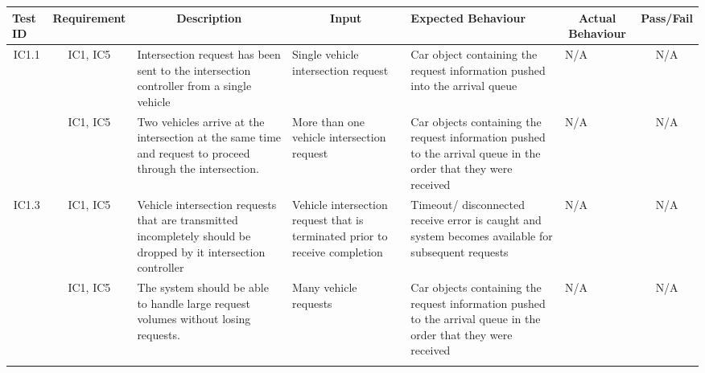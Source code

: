 \documentclass [10pt]{article}
\begin{document}
  \begin{longtable}{ | p{ } | p{ } |  p{ } |  p{ } | p{ } | p{ } |  p{ } |}  \hline

    \rowcolor{subsectionC}\textbf{Test ID}
    & \multicolumn{1}{c|}{\textbf{Requirement} }
    &\multicolumn{1}{c|}{\textbf{Description} }
    & \multicolumn{1}{c|}{\textbf{Input} }
    & \textbf{Expected Behaviour} 
    & \multicolumn{1}{c|}{\textbf{Actual Behaviour} }
    & \multicolumn{1}{c|}{\textbf{Pass/Fail}} \\  \hline
    
    \multicolumn{1}{|c|}{IC1.1} 
    & \multicolumn{1}{c|}{IC1, IC5}
    & Intersection request has been sent to the intersection controller from a single vehicle
    & Single vehicle intersection request 
    & Car object containing the request information pushed into the arrival queue
    & N/A
    & \multicolumn{1}{|c|}{N/A}\\ \hline
    \rowcolor{tableCell}\multicolumn{1}{|c|}{IC1.2} 
    & \multicolumn{1}{c|}{IC1, IC5}
    & Two vehicles arrive at the intersection at the same time and request to proceed through the intersection. 
    & More than one vehicle intersection request 
    & Car objects containing the request information pushed to the arrival queue in the order that they were received 
    & N/A
    & \multicolumn{1}{|c|}{N/A}\\ \hline
    
    \multicolumn{1}{|c|}{IC1.3} 
    & \multicolumn{1}{c|}{IC1, IC5}
    & Vehicle intersection requests that are transmitted incompletely should be dropped by it intersection controller
    &  Vehicle intersection request that is terminated prior to receive completion
    & Timeout/ disconnected receive error is caught and system becomes available for subsequent requests
    & N/A
    & \multicolumn{1}{|c|}{N/A}\\ \hline 
    
    
    
  
  
    
    \rowcolor{tableCell}\multicolumn{1}{|c|}{IC1.4} 
    & \multicolumn{1}{c|}{IC1, IC5}
    & The system should be able to handle large request volumes without losing requests. 
    & Many vehicle requests
    &  Car objects containing the request information pushed to the arrival queue in the order that they were received 
    & N/A
    & \multicolumn{1}{|c|}{N/A}\\ \hline
    \newpage \hline



\end{longtable}
\end{document}
